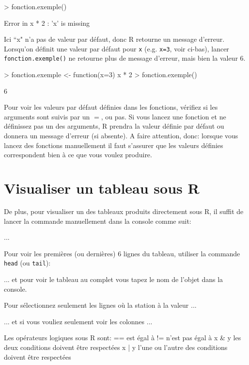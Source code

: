 \documentclass{article}
\begin{document}
\begin{Schunk}
\begin{Sinput}
> fonction.exemple()
\end{Sinput}
\end{Schunk}
\begin{Schunk}
\begin{Soutput}
Error in x * 2 : 'x' is missing
\end{Soutput}
\end{Schunk}
Ici ``x" n'a pas de valeur par défaut, donc R retourne un message
d'erreur. Lorsqu'on définit une valeur par défaut pour \texttt{x}
(e.g. \texttt{x=3}, voir ci-bas),
lancer \texttt{fonction.exemple()} ne retourne plus de message
d'erreur, mais bien la valeur $6$.
\begin{Schunk}
\begin{Sinput}
> fonction.exemple <- function(x=3) x * 2
> fonction.exemple()
\end{Sinput}
\begin{Soutput}
[1] 6
\end{Soutput}
\end{Schunk}

Pour voir les valeurs par défaut définies dans les fonctions,
vérifiez si les arguments sont suivis par un \texttt{$=$}, ou pas. Si vous lancez une
fonction et ne définissez pas un des arguments, R prendra la valeur
définie par défaut ou donnera un message d'erreur (si absente). A
faire attention, donc: lorsque vous lancez des fonctions manuellement
il faut s'assurer que les valeurs définies correspondent bien à ce que vous
voulez produire.

\section{Visualiser un tableau sous R}

De plus, pour visualiser un des tableaux produits directement sous R,
il suffit de lancer la commande manuellement dans la console comme
suit:

...

Pour voir les premières (ou dernières) 6 lignes du tableau, utiliser
la commande \texttt{head} (ou \texttt{tail}):

... et pour voir le tableau au complet vous tapez le nom de l'objet
dans la console.


Pour sélectionnez seulement les lignes où la station à la valeur ...

... et si vous vouliez seulement voir les colonnes ...

Les opérateurs logiques sous R sont:
== est égal à
!= n'est pas égal à
x \& y les deux conditions doivent être respectées
x | y l'une ou l'autre des conditions doivent être respectées
\end{document}
